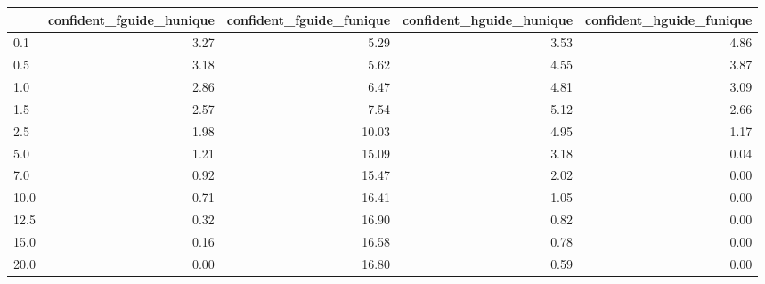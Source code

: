 \begin{tabular}{lrrrr}
\toprule
 & confident_fguide_hunique & confident_fguide_funique & confident_hguide_hunique & confident_hguide_funique \\
\midrule
0.1 & 3.27 & 5.29 & 3.53 & 4.86 \\
0.5 & 3.18 & 5.62 & 4.55 & 3.87 \\
1.0 & 2.86 & 6.47 & 4.81 & 3.09 \\
1.5 & 2.57 & 7.54 & 5.12 & 2.66 \\
2.5 & 1.98 & 10.03 & 4.95 & 1.17 \\
5.0 & 1.21 & 15.09 & 3.18 & 0.04 \\
7.0 & 0.92 & 15.47 & 2.02 & 0.00 \\
10.0 & 0.71 & 16.41 & 1.05 & 0.00 \\
12.5 & 0.32 & 16.90 & 0.82 & 0.00 \\
15.0 & 0.16 & 16.58 & 0.78 & 0.00 \\
20.0 & 0.00 & 16.80 & 0.59 & 0.00 \\
\bottomrule
\end{tabular}
